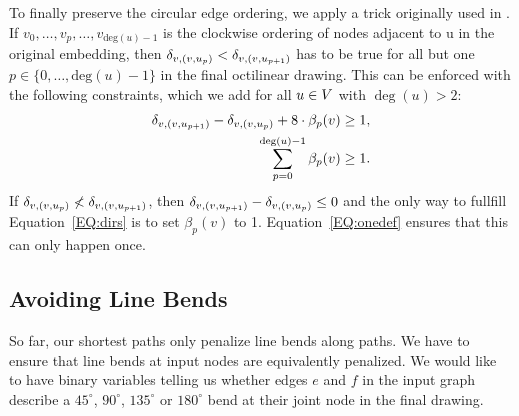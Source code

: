 \documentclass[sigconf]{acmart}
\begin{document}
To finally preserve the circular edge ordering, we apply a trick originally used in \cite{noellenburg}.
If $v_0, \dots, v_p, \dots, v_{\text{deg}(u) - 1}$ is the clockwise ordering of nodes adjacent to u in the original embedding, then $\delta_{v,(v, u_{p})} < \delta_{v,(v, u_{p + 1})}$ has to be true for all but one $p \in \{0, \dots, \text{deg}(u) - 1\}$ in the final octilinear drawing.
This can be enforced with the following constraints, which we add for all  $u \in V$ with $\deg(u) > 2$:
%
\begin{align}
  \delta_{v,(v, u_{p + 1})} - \delta_{v,(v, u_{p})} + 8\cdot\beta_p(v) &\geq 1,\label{EQ:dirs}\\
  \sum_{p = 0}^{\deg(u)-1} \beta_p(v) &\geq 1\label{EQ:onedef}.
\end{align}
%
If $\delta_{v,(v, u_{p})} \not< \delta_{v,(v, u_{p + 1})}$, then $\delta_{v,(v, u_{p + 1})} - \delta_{v,(v, u_{p})} \leq 0$ and the only way to fullfill Equation~\ref{EQ:dirs} is to set $\beta_p(v)$ to 1.
Equation~\ref{EQ:onedef} ensures that this can only happen once.

\subsection{Avoiding Line Bends}

So far, our shortest paths only penalize line bends along paths.
We have to ensure that line bends at input nodes are equivalently penalized.
We would like to have binary variables telling us whether edges $e$ and $f$ in the input graph describe a $45^{\circ}$, $90^{\circ}$, $135^{\circ}$ or $180^{\circ}$ bend at their joint node in the final drawing.
\end{document}
